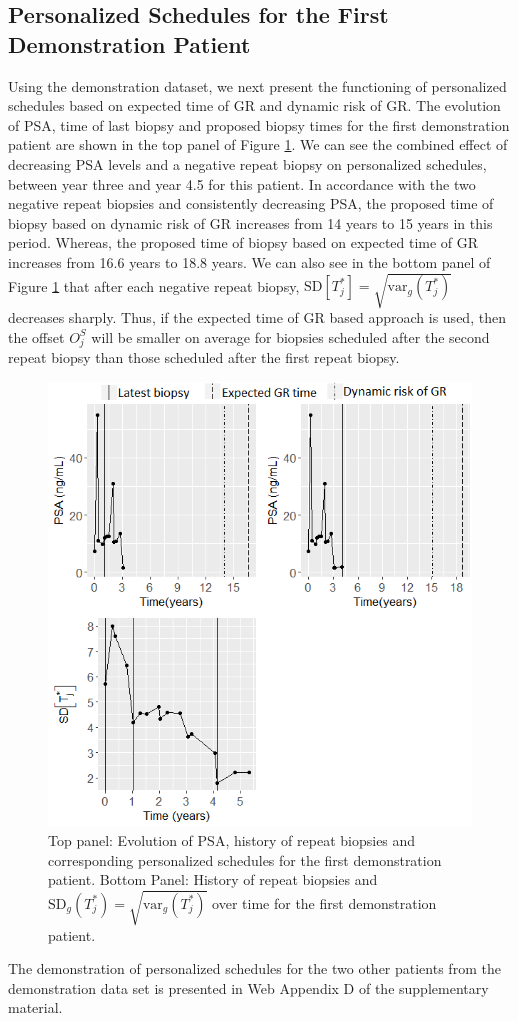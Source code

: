 \subsection{Personalized Schedules for the First Demonstration Patient}
\label{subsec : demo_prias_pers_schedule}
Using the demonstration dataset, we next present the functioning of personalized schedules based on expected time of GR and dynamic risk of GR. The evolution of PSA, time of last biopsy and proposed biopsy times for the first demonstration patient are shown in the top panel of Figure \ref{web_fig : prias_demo_pid_911}. We can see the combined effect of decreasing PSA levels and a negative repeat biopsy on personalized schedules, between year three and year 4.5 for this patient. In accordance with the two negative repeat biopsies and consistently decreasing PSA, the proposed time of biopsy based on dynamic risk of GR increases from 14 years to 15 years in this period. Whereas, the proposed time of biopsy based on expected time of GR increases from 16.6 years to 18.8 years. We can also see in the bottom panel of Figure \ref{web_fig : prias_demo_pid_911} that after each negative repeat biopsy, $\mbox{SD}[T^*_j] = \sqrt{\mbox{var}_g(T^*_j)}$ decreases sharply. Thus, if the expected time of GR based approach is used, then the offset $O^S_j$ will be smaller on average for biopsies scheduled after the second repeat biopsy than those scheduled after the first repeat biopsy.

\begin{figure}
\centerline{
\includegraphics[width=\columnwidth]{images/prias_demo/case_911.png}
}
\caption{Top panel: Evolution of PSA, history of repeat biopsies and corresponding personalized schedules for the first demonstration patient. Bottom Panel: History of repeat biopsies and $\mbox{SD}_g(T^*_j) = \sqrt{\mbox{var}_g(T^*_j)}$ over time for the first demonstration patient.}
\label{web_fig : prias_demo_pid_911}
\end{figure}

The demonstration of personalized schedules for the two other patients from the demonstration data set is presented in Web Appendix D of the supplementary material.